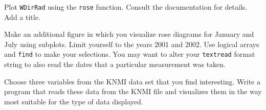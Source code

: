 \begin{action}
Plot {\tt WDirRad} using the {\tt rose} function. Consult the documentation for details. Add a title.
\end{action}
\begin{action}
Make an additional figure in which you visualize rose diagrams for January and July using subplots. Limit yourself to the years 2001 and 2002. Use logical arrays and {\tt find} to make your selections. You may want to alter your {\tt textread} format string to also read the dates that a particular measurement was taken.
\end{action}
\begin{action}
Choose three variables from the KNMI data set that you find interesting. Write a program that reads these data from the KNMI file and visualizes them in the way most suitable for the type of data displayed.
\end{action}

\begin{landscape}

\end{landscape}